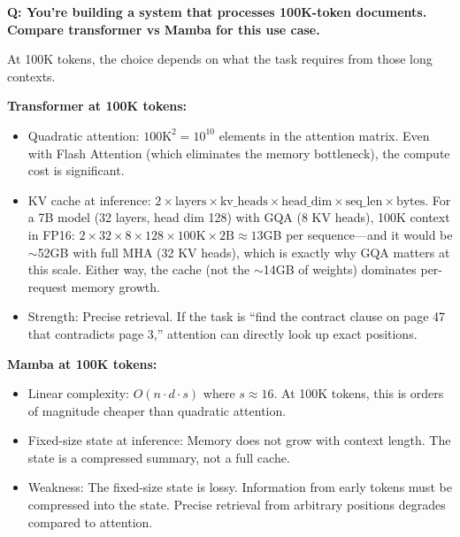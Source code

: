\begin{interviewq}
\textbf{Q: You're building a system that processes 100K-token documents. Compare transformer vs Mamba for this use case.}

 \quad {} \quad \badgefreq{\freqmed}

\stronganswer

At 100K tokens, the choice depends on what the task requires from those long contexts.

\textbf{Transformer at 100K tokens:}
\begin{itemize}
    \item Quadratic attention: $100\text{K}^2 = 10^{10}$ elements in the attention matrix. Even with Flash Attention (which eliminates the memory bottleneck), the compute cost is significant.
    \item KV cache at inference: $2 \times \text{layers} \times \text{kv\_heads} \times \text{head\_dim} \times \text{seq\_len} \times \text{bytes}$. For a 7B model (32 layers, head dim 128) with GQA (8 KV heads), 100K context in FP16: $2 \times 32 \times 8 \times 128 \times 100\text{K} \times 2\text{B} \approx 13$GB per sequence---and it would be $\sim$52GB with full MHA (32 KV heads), which is exactly why GQA matters at this scale. Either way, the cache (not the $\sim$14GB of weights) dominates per-request memory growth.
    \item Strength: Precise retrieval. If the task is ``find the contract clause on page 47 that contradicts page 3,'' attention can directly look up exact positions.
\end{itemize}

\textbf{Mamba at 100K tokens:}
\begin{itemize}
    \item Linear complexity: $O(n \cdot d \cdot s)$ where $s \approx 16$. At 100K tokens, this is orders of magnitude cheaper than quadratic attention.
    \item Fixed-size state at inference: Memory does not grow with context length. The state is a compressed summary, not a full cache.
    \item Weakness: The fixed-size state is lossy. Information from early tokens must be compressed into the state. Precise retrieval from arbitrary positions degrades compared to attention.
\end{itemize}


\end{interviewq}

